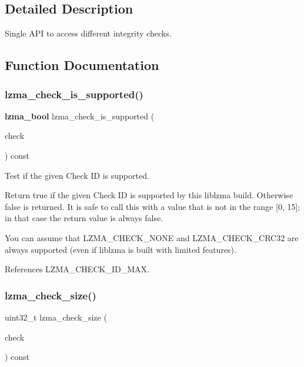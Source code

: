\subsection{Detailed Description}
Single A\+PI to access different integrity checks. 



\subsection{Function Documentation}
\mbox{\label{check_8c_ad30cfdef37f0da36b908299845f63ef2}} 
\subsubsection{lzma\+\_\+check\+\_\+is\+\_\+supported()}
{\footnotesize\ttfamily \textbf{ lzma\+\_\+bool} lzma\+\_\+check\+\_\+is\+\_\+supported (\begin{DoxyParamCaption}\item[{\textbf{ lzma\+\_\+check}}]{check }\end{DoxyParamCaption}) const}



Test if the given Check ID is supported. 

Return true if the given Check ID is supported by this liblzma build. Otherwise false is returned. It is safe to call this with a value that is not in the range [0, 15]; in that case the return value is always false.

You can assume that L\+Z\+M\+A\+\_\+\+C\+H\+E\+C\+K\+\_\+\+N\+O\+NE and L\+Z\+M\+A\+\_\+\+C\+H\+E\+C\+K\+\_\+\+C\+R\+C32 are always supported (even if liblzma is built with limited features). 

References L\+Z\+M\+A\+\_\+\+C\+H\+E\+C\+K\+\_\+\+I\+D\+\_\+\+M\+AX.

\mbox{\label{check_8c_a17e75c39b6cb8a0151a6eabfbe78cca9}} 
\subsubsection{lzma\+\_\+check\+\_\+size()}
{\footnotesize\ttfamily uint32\+\_\+t lzma\+\_\+check\+\_\+size (\begin{DoxyParamCaption}\item[{\textbf{ lzma\+\_\+check}}]{check }\end{DoxyParamCaption}) const}



